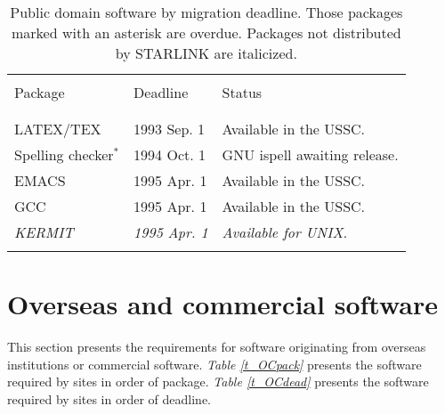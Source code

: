 \begin{table}
\begin{center}
\caption{Public domain software by migration deadline.
Those packages marked with an asterisk are overdue.
Packages not distributed by STARLINK are italicized.}
\vspace{5mm}
\begin{tabular}{|p{36mm}|p{30mm}|p{60mm}|} \hline \label{t_PDdead}
& & \\
Package & Deadline & Status \\
& & \\ \hline
& & \\
LATEX/TEX                 & 1993 Sep. 1      & Available in the USSC. \\
Spelling checker$^{\ast}$ & 1994 Oct. 1      & GNU ispell awaiting release. \\
EMACS                     & 1995 Apr. 1      & Available in the USSC. \\
GCC                       & 1995 Apr. 1      & Available in the USSC. \\
{\em KERMIT}              & {\em 1995 Apr. 1} & {\em Available for UNIX.} \\
& & \\ \hline
\end{tabular}
\end{center}
\end{table}

\newpage
\section{Overseas and commercial software}

This section presents the requirements for software originating from overseas
institutions or commercial software.
{\em Table \ref{t_OCpack}} presents the software required by sites in 
order of package.
{\em Table \ref{t_OCdead}} presents the software required by sites in 
order of deadline.

